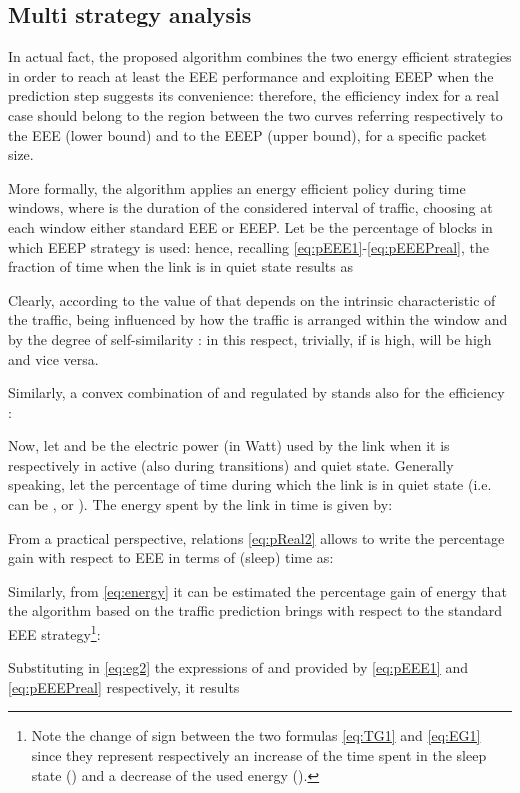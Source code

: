 \documentclass[journal,10pt,twoside,final]{IEEEtran}
\begin{document}
\subsection{Multi strategy analysis}


In actual fact, the proposed algorithm combines the two energy efficient strategies in order to reach at least the EEE performance and exploiting EEEP when the prediction step suggests its convenience: therefore, the efficiency index for a real case should belong to the region between the two curves referring respectively to the EEE (lower bound) and to the EEEP (upper bound), for a specific packet size. 

More formally, the algorithm applies an energy efficient policy during  time windows, where  is the duration of the considered interval of traffic, choosing at each window either standard EEE or EEEP. Let  be the percentage of blocks in which EEEP strategy is used: hence, recalling \eqref{eq:pEEE1}-\eqref{eq:pEEEPreal}, the fraction of time  when the link is in quiet state results as

Clearly,  according to the value of  that depends on the intrinsic characteristic of the traffic, being influenced by how the traffic is arranged within the window and by the degree of self-similarity : in this respect, trivially, if  is high,  will be high and vice versa.
 
Similarly, a convex combination of  and  regulated by  stands also for the efficiency :

 
Now, let  and  be the electric power (in Watt) used by the link when it is respectively in active (also during transitions) and quiet state. Generally speaking, let  the percentage of time during which the link is in quiet state (i.e.  can be ,  or ). The energy  spent by the link in  time is given by:
  

From a practical perspective, relations \eqref{eq:pReal2} allows to write the percentage gain  with respect to EEE in terms of (sleep) time as:


Similarly, from \eqref{eq:energy} it can be estimated the percentage gain of energy  that the algorithm based on the traffic prediction brings with respect to the standard EEE strategy\footnote{Note the change of sign between the two formulas \eqref{eq:TG1} and \eqref{eq:EG1} since they represent respectively an increase of the time spent in the sleep state () and a decrease of the used energy ().}:


Substituting in \eqref{eq:eg2} the expressions of  and  provided by \eqref{eq:pEEE1} and \eqref{eq:pEEEPreal} respectively, it results
\end{document}
